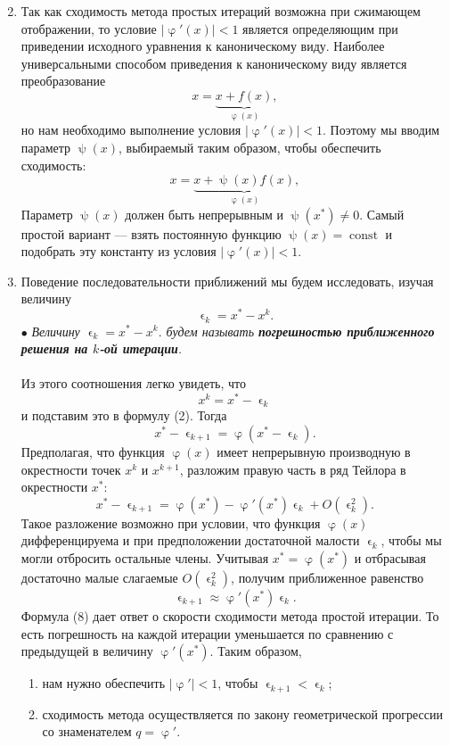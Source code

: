 \documentclass[a4paper, 12pt]{report}
\numberwithin{equation}{section}
\renewcommand{\varphi}{\upvarphi}
\renewcommand{\psi}{\uppsi}
\renewcommand{\varepsilon}{\upvarepsilon}
\begin{document}
\begin{enumerate}
$$		$$
		\item Так как сходимость метода простых итераций возможна при сжимающем отображении, то условие $|\varphi'(x)|<1$ является определяющим при приведении исходного уравнения к каноническому виду.
		Наиболее универсальными способом приведения к каноническому виду является преобразование $$x = \underbrace{x+f(x)}_{\varphi(x)},$$
		но нам необходимо выполнение условия $|\varphi'(x)|<1$. Поэтому мы вводим параметр $\psi(x)$, выбираемый таким образом, чтобы обеспечить сходимость: $$x = \underbrace{x+\psi(x)f(x)}_{\varphi(x)},$$ Параметр $\psi(x)$ должен быть непрерывным и  $\psi(x^*)\ne 0.$ Самый простой вариант --- взять постоянную функцию $\psi(x)=\operatorname{const}$ и подобрать эту константу из условия $|\varphi'(x)|<1$.
		\item Поведение последовательности приближений мы будем исследовать, изучая величину $$\varepsilon_k = x^* - x^k.$$
		$\bullet$ \textit{Величину $\varepsilon_k = x^* - x^k.$ будем называть \textbf{погрешностью приближенного решения на $k$-ой итерации}.}
		\\\\
		 Из этого соотношения легко увидеть, что $$x^k = x^* - \varepsilon_k$$ и подставим это в формулу (2). Тогда $$x^* - \varepsilon_{k+1} = \varphi(x^* - \varepsilon_k).$$
		Предполагая, что функция $\varphi(x)$ имеет непрерывную производную в окрестности точек $x^k$ и $x^{k+1}$, разложим правую часть в ряд Тейлора в окрестности $x^*$:
		$$x^* - \varepsilon_{k+1} = \varphi(x^*) - \varphi'(x^*)\varepsilon_k + O(\varepsilon_k^2).$$ Такое разложение возможно при условии, что функция $\varphi(x)$ дифференцируема и при предположении достаточной малости $\varepsilon_k$, чтобы мы могли отбросить остальные члены. Учитывая $x^* = \varphi(x^*)$ и отбрасывая достаточно малые слагаемые $O(\varepsilon_k^2)$, получим приближенное равенство 
		\begin{equation}
			\varepsilon_{k+1} \approx \varphi'(x^*)\varepsilon_k.
		\end{equation}
		Формула (8) дает ответ о скорости сходимости метода простой итерации. То есть погрешность на каждой итерации уменьшается по сравнению с предыдущей в величину $\varphi'(x^*)$. Таким образом, \begin{enumerate}
			\item нам нужно обеспечить $|\varphi'|<1$, чтобы $\varepsilon_{k+1} < \varepsilon_k$;
			\item сходимость метода осуществляется по закону геометрической прогрессии со знаменателем $q = \varphi'$.
		\end{enumerate}
	\end{enumerate}
\end{document}
